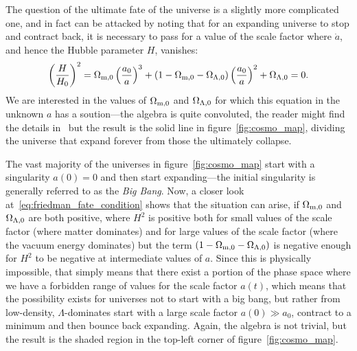 The question of the ultimate fate of the universe is a slightly more complicated
one, and in fact can be attacked by noting that for an expanding universe to stop
and contract back, it is necessary to pass for a value of the scale factor where
$\dot{a}$, and hence the Hubble parameter $H$, vanishes:
\begin{align}\label{eq:friedman_fate_condition}
  \left( \frac{H}{H_0} \right)^2 =
  \Omega_\text{m,0} \left(\frac{a_0}{a}\right)^3 +
  (1 - \Omega_\text{m,0} - \Omega_{\Lambda,0}) \left(\frac{a_0}{a}\right)^2 +
  \Omega_{\Lambda,0} = 0.
\end{align}
We are interested in the values of $\Omega_\text{m,0}$ and $\Omega_{\Lambda,0}$ for which
this equation in the unknown $a$ has a soution---the algebra is quite convoluted,
the reader might find the details in~\cite{2001_carrol} but the result is the
solid line in figure~\ref{fig:cosmo_map}, dividing the universe that expand forever
from those the ultimately collapse.

The vast majority of the universes in figure~\ref{fig:cosmo_map} start with a
singularity $a(0) = 0$ and then start expanding---the initial singularity is generally
referred to as the \emph{Big Bang}. Now, a closer look at~\eqref{eq:friedman_fate_condition}
shows that the situation can arise, if $\Omega_\text{m,0}$ and $\Omega_{\Lambda,0}$ are both
positive, where $H^2$ is positive both for small values of the scale factor (where
matter dominates) and for large values of the scale factor (where the vacuum energy
dominates) but the term $(1 - \Omega_\text{m,0} - \Omega_{\Lambda,0})$ is negative enough
for $H^2$ to be negative at intermediate values of $a$. Since this is physically
impossible, that simply means that there exist a portion of the phase space where
we have a forbidden range of values for the scale factor $a(t)$, which means that
the possibility exists for universes not to start with a big bang, but rather from
low-density, $\Lambda$-dominates start with a large scale factor $a(0) \gg a_0$,
contract to a minimum and then bounce back expanding. Again, the algebra is not
trivial, but the result is the shaded region in the top-left corner of
figure~\ref{fig:cosmo_map}.



